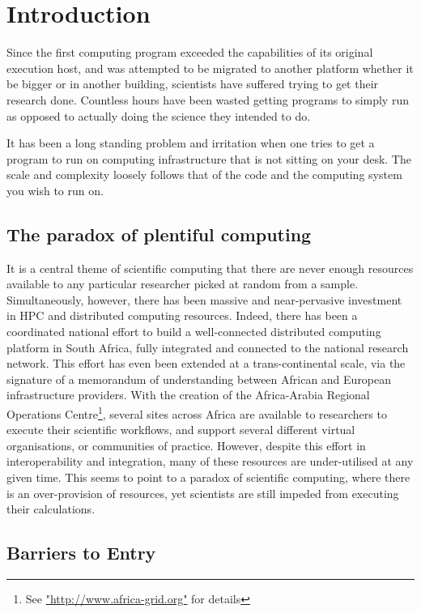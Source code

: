 \documentclass[a4paper]{jpconf}
\begin{document}
\section{Introduction}
Since the first computing program exceeded the capabilities of its original execution host, and was attempted to be migrated to another platform whether it be bigger or in another building, scientists have suffered trying to get their research done. Countless hours have been wasted getting programs to simply run as opposed to actually doing the science they intended to do.

It has been a long standing problem and irritation when one tries to get a program to run on computing infrastructure that is not sitting on your desk. The scale and complexity loosely follows that of the code and the computing system you wish to run on.

\subsection{The paradox of  plentiful computing}

It is a central theme of scientific computing that there are never enough resources available to any particular researcher picked at random from a sample. Simultaneously, however, there has been massive and near-pervasive investment in HPC and distributed computing resources. Indeed, there has been a coordinated national effort to build a well-connected distributed computing platform in South Africa\cite{SAGrid}, fully integrated and connected to the national research network\cite{SANREN}. This effort has even been extended at a trans-continental scale, via the signature of a memorandum of understanding between African and European infrastructure providers\cite{AAROC}. With the creation of the Africa-Arabia Regional Operations Centre\footnote{See \url{"http://www.africa-grid.org"} for details}, several sites across Africa are available to researchers to execute their scientific workflows, and support several different virtual organisations, or communities of practice. However, despite this effort in interoperability and integration, many of these resources are under-utilised at any given time. This seems to point to a paradox of scientific computing, where there is an over-provision of resources, yet scientists are still impeded from executing their calculations.

\subsection{Barriers to Entry}
\end{document}
